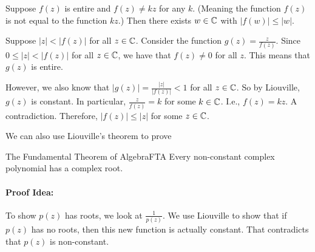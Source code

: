 \begin{ex}{}{} Suppose $f(z)$ is entire and $f(z)\ne kz$ for any $k$. (Meaning the function $f(z)$ is not equal to the function $kz$.) Then there exists $w\in \mathbb{C}$ with $|f(w)|\le|w|$.

Suppose $|z| < |f(z)|$ for all $z\in \mathbb{C}$. Consider the function $g(z) = \frac{z}{f(z)}$. Since $0 \le |z| < |f(z)|$ for all $z\in \mathbb{C}$, we have that $f(z)\ne 0$ for all $z$. This means that $g(z)$ is entire.

However, we also know that $|g(z)| = \frac{|z|}{|f(z)|} < 1$ for all $z\in \mathbb{C}$. So by Liouville, $g(z)$ is constant. In particular, $\frac{z}{f(z)} = k$ for some $k\in \mathbb{C}$. I.e., $f(z) = kz$. A contradiction. Therefore, $|f(z)|\le |z|$ for some $z\in \mathbb{C}$.

\end{ex}

We can also use Liouville's theorem to prove 


\begin{thmbo}{The Fundamental Theorem of Algebra}{FTA}
Every non-constant complex polynomial has a complex root.
\end{thmbo}

 \paragraph{Proof Idea:} To show $p(z)$ has roots, we look at $\frac{1}{p(z)}$. We use Liouville to show that if $p(z)$ has no roots, then this new function is actually constant. That contradicts that $p(z)$ is non-constant.

